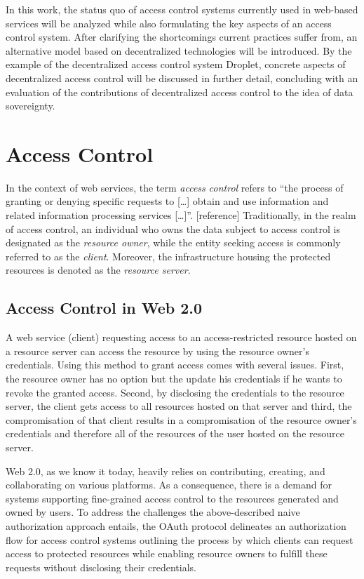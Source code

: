 \documentclass[conference]{IEEEtran}
\begin{document}
In this work, the status quo of access control systems currently used in web-based services will be analyzed while also formulating the key aspects of an access control system.
After clarifying the shortcomings current practices suffer from, an alternative model based on decentralized technologies will be introduced.
By the example of the decentralized access control system Droplet, concrete aspects of decentralized access control will be discussed in further detail, concluding with an evaluation of the contributions of decentralized access control to the idea of data sovereignty.

\section{Access Control}
In the context of web services, the term \textit{access control} refers to \enquote{the process of granting or denying specific requests to [\dots] obtain and use information and related information processing services [\dots]}. [reference] %
Traditionally, in the realm of access control, an individual who owns the data subject to access control is designated as the \textit{resource owner}, while the entity seeking access is commonly referred to as the \textit{client}.
Moreover, the infrastructure housing the protected resources is denoted as the \textit{resource server}.

\subsection{Access Control in Web 2.0}
A web service (client) requesting access to an access-restricted resource hosted on a resource server can access the resource by using the resource owner's credentials.
Using this method to grant access comes with several issues.
First, the resource owner has no option but the update his credentials if he wants to revoke the granted access.
Second, by disclosing the credentials to the resource server, the client gets access to all resources hosted on that server and third, the compromisation of that client results in a compromisation of the resource owner's credentials and therefore all of the resources of the user hosted on the resource server.

Web 2.0, as we know it today, heavily relies on contributing, creating, and collaborating on various platforms. \cite{community_web_2019}
As a consequence, there is a demand for systems supporting fine-grained access control to the resources generated and owned by users. 
To address the challenges the above-described naive authorization approach entails, the OAuth protocol delineates an authorization flow for access control systems outlining the process by which clients can request access to protected resources while enabling resource owners to fulfill these requests without disclosing their credentials.
\end{document}

